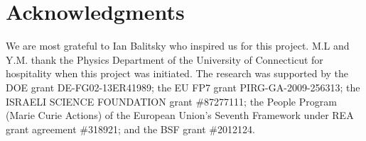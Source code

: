 \documentclass[11pt,a4paper]{article}
\begin{document}


\section*{Acknowledgments}
We are most grateful to Ian Balitsky who inspired us for this project.  M.L and Y.M. thank the Physics Department of the University of Connecticut for hospitality
when this project was initiated.
The research was supported by the DOE grant DE-FG02-13ER41989; the EU FP7 grant PIRG-GA-2009-256313; the 
 ISRAELI SCIENCE FOUNDATION grant \#87277111;   the People Program (Marie Curie Actions) of the European Union's Seventh Framework   under REA
grant agreement \#318921;  and the BSF grant \#2012124.
\end{document}
